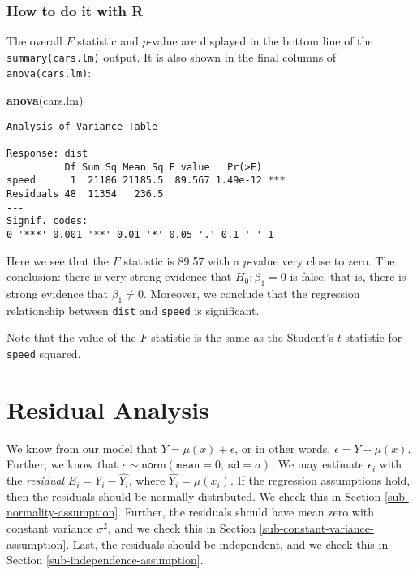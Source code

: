 \documentclass[]{book}
\newenvironment{Shaded}{\begin{snugshade}}{\end{snugshade}}
\newcommand{\KeywordTok}[1]{\textcolor[rgb]{0.13,0.29,0.53}{\textbf{{#1}}}}
\newcommand{\NormalTok}[1]{{#1}}
\numberwithin{equation}{chapter}
\numberwithin{figure}{chapter}
\theoremstyle{plain}
\theoremstyle{definition}
\theoremstyle{remark}
\theoremstyle{definition}
\theoremstyle{definition}
\theoremstyle{remark}
\begin{document}
\subsubsection{How to do it with R}\label{how-to-do-it-with-r-54}

The overall \(F\) statistic and \(p\)-value are displayed in the bottom
line of the \texttt{summary(cars.lm)} output. It is also shown in the
final columns of \texttt{anova(cars.lm)}:

\begin{Shaded}
\begin{Highlighting}[]
\KeywordTok{anova}\NormalTok{(cars.lm)}
\end{Highlighting}
\end{Shaded}

\begin{verbatim}
Analysis of Variance Table

Response: dist
          Df Sum Sq Mean Sq F value   Pr(>F)    
speed      1  21186 21185.5  89.567 1.49e-12 ***
Residuals 48  11354   236.5                     
---
Signif. codes:  
0 '***' 0.001 '**' 0.01 '*' 0.05 '.' 0.1 ' ' 1
\end{verbatim}

Here we see that the \(F\) statistic is 89.57 with a \(p\)-value very
close to zero. The conclusion: there is very strong evidence that
\(H_{0}:\beta_{1} = 0\) is false, that is, there is strong evidence that
\(\beta_{1} \neq 0\). Moreover, we conclude that the regression
relationship between \texttt{dist} and \texttt{speed} is significant.

Note that the value of the \(F\) statistic is the same as the Student's
\(t\) statistic for \texttt{speed} squared.

\section{Residual Analysis}\label{sec-residual-analysis-slr}

We know from our model that \(Y=\mu(x)+\epsilon\), or in other words,
\(\epsilon=Y-\mu(x)\). Further, we know that
\(\epsilon\sim\mathsf{norm}(\mathtt{mean}=0,\,\mathtt{sd}=\sigma)\). We
may estimate \(\epsilon_{i}\) with the \emph{residual}
\(E_{i}=Y_{i}-\hat{Y_{i}}\), where \(\hat{Y_{i}}=\hat{\mu}(x_{i})\). If
the regression assumptions hold, then the residuals should be normally
distributed. We check this in Section \ref{sub-normality-assumption}.
Further, the residuals should have mean zero with constant variance
\(\sigma^{2}\), and we check this in Section
\ref{sub-constant-variance-assumption}. Last, the residuals should be
independent, and we check this in Section
\ref{sub-independence-assumption}.
\end{document}
